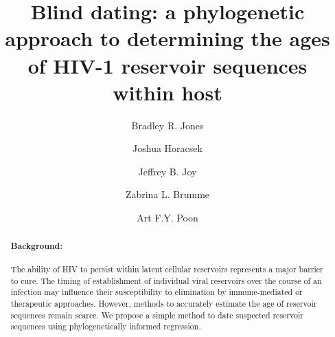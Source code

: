 \documentclass{bmcart}
\begin{document}
\pagewiselinenumbers

\begin{frontmatter}

\begin{fmbox}

\dochead{}

\title{Blind dating: a phylogenetic approach to determining the ages of HIV-1 reservoir sequences within host}

\author[addressref={1,2},email={brj1@sfu.ca}]{Bradley R. Jones} %
\author[addressref={1,2},email={jjh13@sfu.ca}]{Joshua Horacsek} %
\author[addressref={2,3},email={jjoy@cfenet.ubc.ca}]{Jeffrey B. Joy} %
\author[addressref={1,2},email={zbrumme@sfu.ca}]{Zabrina L. Brumme} %
\author[addressref={2,3},email={apoon@cfenet.ubc.ca},corref={3}]{Art F.Y. Poon} %
\address[id=1]{  }
\address[id=2]{  }
\address[id=3]{    }

\printaddresses



\begin{artnotes}
\end{artnotes}

\end{fmbox}

\begin{abstractbox}
\begin{abstract}
\paragraph{Background:}
The ability of HIV to persist within latent cellular reservoirs represents a major barrier to
cure.
The timing of establishment of individual viral reservoirs over the course of an infection may influence their susceptibility to elimination by immune-mediated or therapeutic approaches.
However, methods to accurately estimate the age of reservoir sequences remain scarce.
We propose a simple method to date suspected reservoir sequences using phylogenetically informed regression.
 

\end{abstract}
\end{abstractbox}
\end{frontmatter}
\end{document}

